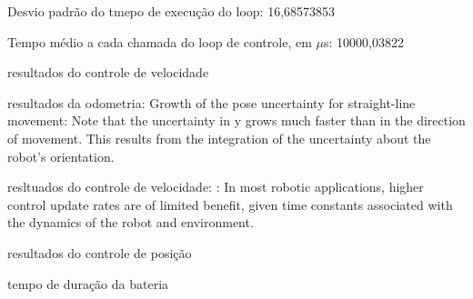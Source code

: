 Desvio padrão do tmepo de execução do loop: 16,68573853

Tempo médio a cada chamada do loop de controle, em $\mu$s: 10000,03822

resultados do controle de velocidade

resultados da odometria:
Growth of the pose uncertainty for straight-line movement: Note that the uncertainty in y grows much
faster than in the direction of movement. This results from the integration of the uncertainty about the
robot’s orientation. \citep{siegwart2011introduction}

resltuados do controle de velocidade:
\citet{lynch2017modern}: In most robotic applications, higher control update rates are of limited benefit, given
time constants associated with the dynamics of the robot and environment.

resultados do controle de posição

tempo de duração da bateria
